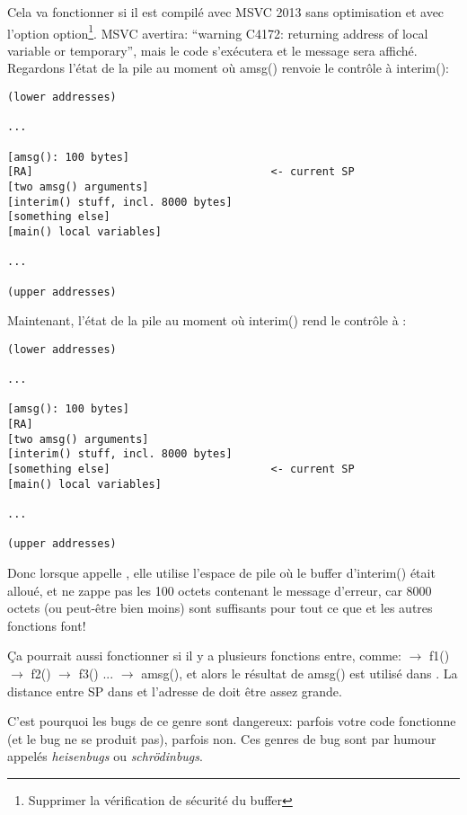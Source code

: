 Cela va fonctionner si il est compilé avec MSVC 2013 sans optimisation et avec l'option
 option\footnote{Supprimer la vérification de sécurité du buffer}.
MSVC avertira: ``warning C4172: returning address of local variable or temporary'',
mais le code s'exécutera et le message sera affiché.
Regardons l'état de la pile au moment où amsg() renvoie le contrôle à interim():

\begin{lstlisting}
(lower addresses)

...

[amsg(): 100 bytes]
[RA]                                     <- current SP
[two amsg() arguments]
[interim() stuff, incl. 8000 bytes]
[something else]
[main() local variables]

...

(upper addresses)
\end{lstlisting}

Maintenant, l'état de la pile au moment où interim() rend le contrôle à \main{}:

\begin{lstlisting}
(lower addresses)

...

[amsg(): 100 bytes]
[RA]
[two amsg() arguments]
[interim() stuff, incl. 8000 bytes]
[something else]                         <- current SP
[main() local variables]

...

(upper addresses)
\end{lstlisting}

Donc lorsque \main appelle \printf, elle utilise l'espace de pile où le buffer d'interim()
était alloué, et ne zappe pas les 100 octets contenant le message d'erreur, car 8000
octets (ou peut-être bien moins) sont suffisants pour tout ce que \printf et les autres
fonctions font!

Ça pourrait aussi fonctionner si il y a plusieurs fonctions entre, comme:
\main $\rightarrow$ f1() $\rightarrow$ f2() $\rightarrow$ f3() ... $\rightarrow$ amsg(),
et alors le résultat de amsg() est utilisé dans \main.
La distance entre \ac{SP} dans \main et l'adresse de  doit être assez grande.

C'est pourquoi les bugs de ce genre sont dangereux: parfois votre code fonctionne
(et le bug ne se produit pas), parfois non.
\label{heisenbug}
Ces genres de bug sont par humour appelés \emph{heisenbugs} ou \emph{schrödinbugs}.
